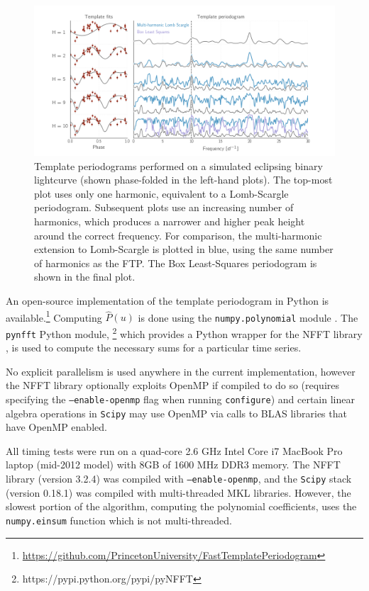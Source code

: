 \documentclass[iop]{emulateapj}
\begin{document}
\begin{figure}
    \centering
    \includegraphics[width=\textwidth]{plots/templates_and_periodograms.png}
    \caption{\label{fig:tempsandpdgs} Template periodograms performed on a simulated eclipsing
            binary lightcurve (shown phase-folded in the left-hand plots). The top-most plot 
            uses only one harmonic, equivalent to a Lomb-Scargle periodogram. Subsequent plots
            use an increasing number of harmonics, which produces a narrower and higher peak
            height around the correct frequency. For comparison, the multi-harmonic extension 
            to Lomb-Scargle is plotted in blue, using the same number of harmonics as the FTP.
            The Box Least-Squares \citep{Kovacs_2002} periodogram is shown in the final plot.}
\end{figure}
An open-source implementation of the template periodogram in Python is
available.\footnote{\url{https://github.com/PrincetonUniversity/FastTemplatePeriodogram}} 
Computing $\hat{P}(u)$ is done using the \texttt{numpy.polynomial} module 
\citep{Scipy}. The \texttt{pynfft} Python module,
\footnote{https://pypi.python.org/pypi/pyNFFT} which provides a Python 
wrapper for the NFFT library \citep{NFFT}, is used to compute the necessary 
sums for a particular time series.

No explicit parallelism is used anywhere in the current implementation, 
however the NFFT library optionally exploits OpenMP if compiled
to do so (requires specifying the \texttt{--enable-openmp} flag
when running \texttt{configure}) and certain linear algebra operations
in \texttt{Scipy} may use OpenMP via calls to BLAS libraries that
have OpenMP enabled.

All timing tests were run on a quad-core 2.6 GHz Intel Core i7 MacBook 
Pro laptop (mid-2012 model) with 8GB of 1600 MHz DDR3 memory. The NFFT
library (version 3.2.4) was compiled with \texttt{--enable-openmp}, and
the \texttt{Scipy} stack (version 0.18.1) was compiled with multi-threaded MKL libraries.
However, the slowest portion of the algorithm, computing the polynomial
coefficients, uses the \texttt{numpy.einsum} function which is not
multi-threaded. 
\end{document}
